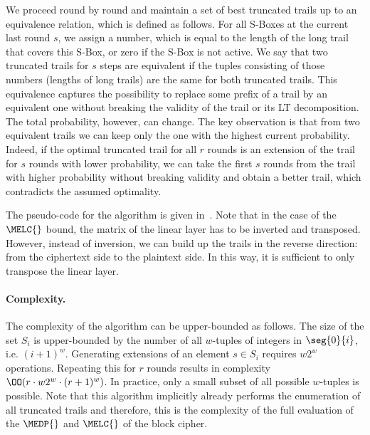 We proceed round by round and maintain a set of best truncated trails up to an equivalence relation, which is defined as follows. For all S-Boxes at the current last round $s$, we assign a number, which is equal to the length of the long trail that covers this S-Box, or zero if the S-Box is not active. We say that two truncated trails for $s$ steps are equivalent if the tuples consisting of those numbers (lengths of long trails) are the same for both truncated trails. This equivalence captures the possibility to replace some prefix of a trail by an equivalent one without breaking the validity of the trail or its LT decomposition. The total probability, however, can change. The key observation is that from two equivalent trails we can keep only the one with the highest current probability. Indeed, if the optimal truncated trail for all $r$ rounds is an extension of the trail for $s$ rounds with lower probability, we can take the first $s$ rounds from the trail with higher probability without breaking validity and obtain a better trail, which contradicts the assumed optimality.

The pseudo-code for the algorithm is given in~.
Note that in the case of the $\MELC{}$ bound, the matrix of the linear layer has to be inverted and transposed. However, instead of inversion, we can build up the trails in the reverse direction: from the ciphertext side to the plaintext side. In this way, it is sufficient to only transpose the linear layer.


\paragraph{Complexity.}
The complexity of the algorithm can be upper-bounded as follows. The size of the set $S_i$ is upper-bounded by the number of all $w$-tuples of integers in $\seg{0}{i}$, i.e. $(i+1)^w$. Generating extensions of an element $s \in S_i$ requires $w2^w$ operations. Repeating this for $r$ rounds results in complexity $\OO(r \cdot w 2^w \cdot (r+1)^w)$. In practice, only a small subset of all possible $w$-tuples is possible. Note that this algorithm implicitly already performs the enumeration of all truncated trails and therefore, this is the complexity of the full evaluation of the $\MEDP{}$ and $\MELC{}$ of the block cipher.
